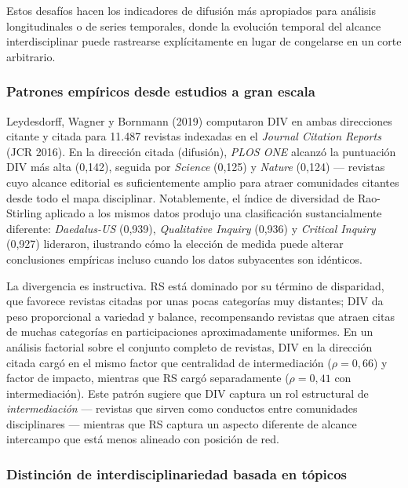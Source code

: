 \documentclass[
]{article}
\begin{document}
Estos desafíos hacen los indicadores de difusión más apropiados para
análisis longitudinales o de series temporales, donde la evolución
temporal del alcance interdisciplinar puede rastrearse explícitamente en
lugar de congelarse en un corte arbitrario.

\hypertarget{patrones-empuxedricos-desde-estudios-a-gran-escala}{%
\subsubsection{Patrones empíricos desde estudios a gran
escala}\label{patrones-empuxedricos-desde-estudios-a-gran-escala}}

Leydesdorff, Wagner y Bornmann (2019) computaron DIV en ambas
direcciones citante y citada para 11.487 revistas indexadas en el
\emph{Journal Citation Reports} (JCR 2016). En la dirección citada
(difusión), \emph{PLOS ONE} alcanzó la puntuación DIV más alta (0,142),
seguida por \emph{Science} (0,125) y \emph{Nature} (0,124) --- revistas
cuyo alcance editorial es suficientemente amplio para atraer comunidades
citantes desde todo el mapa disciplinar. Notablemente, el índice de
diversidad de Rao-Stirling aplicado a los mismos datos produjo una
clasificación sustancialmente diferente: \emph{Daedalus-US} (0,939),
\emph{Qualitative Inquiry} (0,936) y \emph{Critical Inquiry} (0,927)
lideraron, ilustrando cómo la elección de medida puede alterar
conclusiones empíricas incluso cuando los datos subyacentes son
idénticos.

La divergencia es instructiva. RS está dominado por su término de
disparidad, que favorece revistas citadas por unas pocas categorías muy
distantes; DIV da peso proporcional a variedad y balance, recompensando
revistas que atraen citas de muchas categorías en participaciones
aproximadamente uniformes. En un análisis factorial sobre el conjunto
completo de revistas, DIV en la dirección citada cargó en el mismo
factor que centralidad de intermediación (\(\rho = 0,66\)) y factor de
impacto, mientras que RS cargó separadamente (\(\rho = 0,41\) con
intermediación). Este patrón sugiere que DIV captura un rol estructural
de \emph{intermediación} --- revistas que sirven como conductos entre
comunidades disciplinares --- mientras que RS captura un aspecto
diferente de alcance intercampo que está menos alineado con posición de
red.

\hypertarget{distinciuxf3n-de-interdisciplinariedad-basada-en-tuxf3picos}{%
\subsubsection{Distinción de interdisciplinariedad basada en
tópicos}\label{distinciuxf3n-de-interdisciplinariedad-basada-en-tuxf3picos}}
\end{document}
